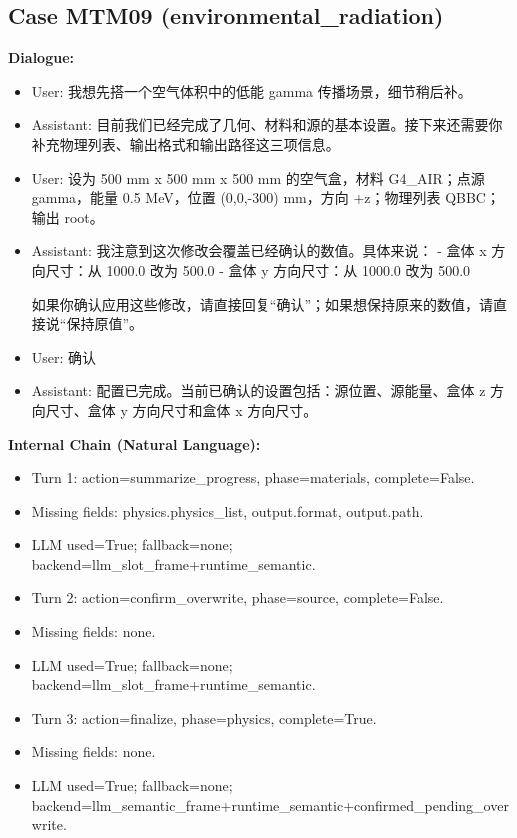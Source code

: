 \documentclass[11pt]{ctexart}
\begin{document}
\subsection{Case MTM09 (environmental\_radiation)}
\textbf{Dialogue:}
\begin{itemize}
\item User: 我想先搭一个空气体积中的低能 gamma 传播场景，细节稍后补。
\item Assistant: 目前我们已经完成了几何、材料和源的基本设置。接下来还需要你补充物理列表、输出格式和输出路径这三项信息。
\item User: 设为 500 mm x 500 mm x 500 mm 的空气盒，材料 G4\_AIR；点源 gamma，能量 0.5 MeV，位置 (0,0,-300) mm，方向 +z；物理列表 QBBC；输出 root。
\item Assistant: 我注意到这次修改会覆盖已经确认的数值。具体来说：  
- 盒体 x 方向尺寸：从 1000.0 改为 500.0  
- 盒体 y 方向尺寸：从 1000.0 改为 500.0  

如果你确认应用这些修改，请直接回复“确认”；如果想保持原来的数值，请直接说“保持原值”。
\item User: 确认
\item Assistant: 配置已完成。当前已确认的设置包括：源位置、源能量、盒体 z 方向尺寸、盒体 y 方向尺寸和盒体 x 方向尺寸。
\end{itemize}
\textbf{Internal Chain (Natural Language):}
\begin{itemize}
\item Turn 1: action=summarize\_progress, phase=materials, complete=False.
\item Missing fields: physics.physics\_list, output.format, output.path.
\item LLM used=True; fallback=none; backend=llm\_slot\_frame+runtime\_semantic.
\item Turn 2: action=confirm\_overwrite, phase=source, complete=False.
\item Missing fields: none.
\item LLM used=True; fallback=none; backend=llm\_slot\_frame+runtime\_semantic.
\item Turn 3: action=finalize, phase=physics, complete=True.
\item Missing fields: none.
\item LLM used=True; fallback=none; backend=llm\_semantic\_frame+runtime\_semantic+confirmed\_pending\_overwrite.
\end{itemize}
\end{document}
